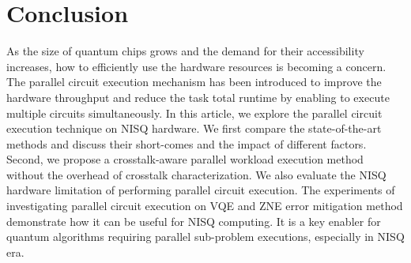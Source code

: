 \documentclass[conference]{IEEEtran}
\begin{document}
\section{Conclusion}
As the size of quantum chips grows and the demand for their accessibility increases, how to efficiently use the hardware resources is becoming a concern. The parallel circuit execution mechanism has been introduced to improve the hardware throughput and reduce the task total runtime by enabling to execute multiple circuits simultaneously. In this article, we explore the parallel circuit execution technique on NISQ hardware. We first compare the state-of-the-art methods and discuss their short-comes and the impact of different factors. Second, we propose a crosstalk-aware parallel workload execution method without the overhead of crosstalk characterization. We also evaluate the NISQ hardware limitation of performing parallel circuit execution. The experiments of investigating parallel circuit execution on VQE and ZNE error mitigation method demonstrate how it can be useful for NISQ computing. It is a key enabler for quantum algorithms requiring parallel sub-problem executions, especially in NISQ era. 

%
\end{document}
